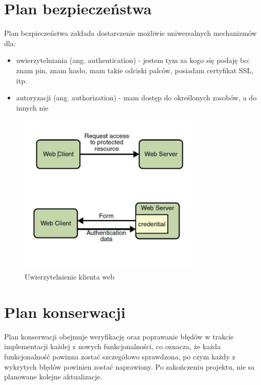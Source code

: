 \documentclass[a4paper,11pt]{uzreport}
\begin{document}
\section{Plan bezpieczeństwa}

	Plan bezpieczeństwa zakłada dostarczenie możliwie uniwersalnych mechanizmów dla:
            \begin{itemize}[leftmargin=0.5in]
                \item uwierzytelniania (ang. authentication) - jestem tym za kogo się podaję bo: znam pin, znam hasło, mam takie odciski palców, posiadam certyfikat 			SSL, itp.
                \item autoryzacji (ang. authorization) - mam dostęp do określonych zasobów, a do innych nie
            \end{itemize}

    \begin{figure}[ht!]
        \centering
        \includegraphics[width=0.8\textwidth]{pictures/uwierzytelnianie_klienta_web.png}
        \caption{Uwierzytelnienie klienta web}
        \label{fig10}
     \end{figure}

\section{Plan konserwacji}
Plan konserwacji obejmuje weryfikację oraz poprawanie błędów w trakcie implementacji każdej z nowych funkcjonalności, co oznacza, że każda funkcjonalność powinna zostać szczegółowo sprawdzona, po czym każdy z wykrytych błędów powinien zostać naprawiony. Po zakończeniu projektu, nie sa planowane kolejne aktualizacje.
\end{document}
